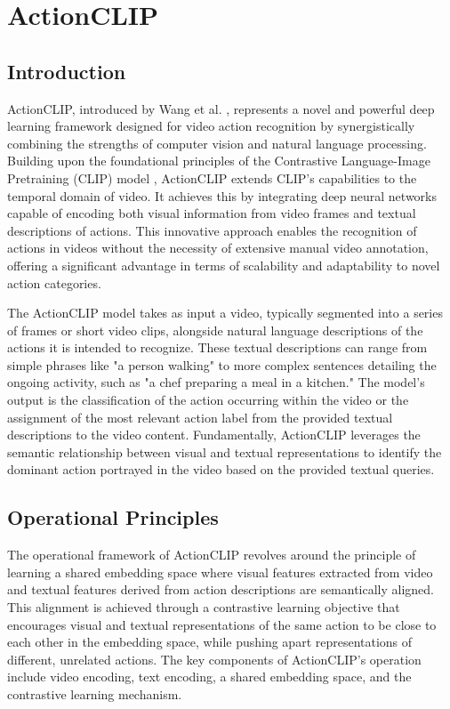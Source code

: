 \section{ActionCLIP}

\subsection{Introduction}

ActionCLIP, introduced by Wang et al. \cite{wang2021actionclip}, represents a novel and powerful deep learning framework designed for video action recognition by synergistically combining the strengths of computer vision and natural language processing. Building upon the foundational principles of the Contrastive Language-Image Pretraining (CLIP) model \cite{radford2021learning}, ActionCLIP extends CLIP's capabilities to the temporal domain of video. It achieves this by integrating deep neural networks capable of encoding both visual information from video frames and textual descriptions of actions. This innovative approach enables the recognition of actions in videos without the necessity of extensive manual video annotation, offering a significant advantage in terms of scalability and adaptability to novel action categories.

The ActionCLIP model takes as input a video, typically segmented into a series of frames or short video clips, alongside natural language descriptions of the actions it is intended to recognize. These textual descriptions can range from simple phrases like "a person walking" to more complex sentences detailing the ongoing activity, such as "a chef preparing a meal in a kitchen." The model's output is the classification of the action occurring within the video or the assignment of the most relevant action label from the provided textual descriptions to the video content. Fundamentally, ActionCLIP leverages the semantic relationship between visual and textual representations to identify the dominant action portrayed in the video based on the provided textual queries.

\subsection{Operational Principles}

The operational framework of ActionCLIP revolves around the principle of learning a shared embedding space where visual features extracted from video and textual features derived from action descriptions are semantically aligned. This alignment is achieved through a contrastive learning objective that encourages visual and textual representations of the same action to be close to each other in the embedding space, while pushing apart representations of different, unrelated actions. The key components of ActionCLIP's operation include video encoding, text encoding, a shared embedding space, and the contrastive learning mechanism.

